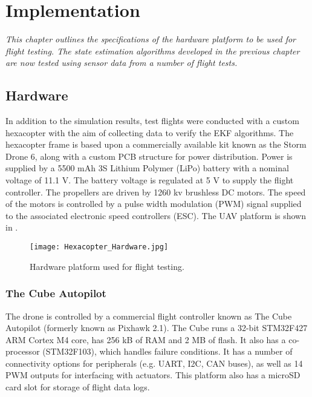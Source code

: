
\chapter{Implementation}\label{chapter:Implementation}
\textit{This chapter outlines the specifications of the hardware platform to be used for flight testing. The state estimation algorithms developed in the previous chapter are now tested using sensor data from a number of flight tests. }


\section{Hardware}\label{section:Hardware}

In addition to the simulation results, test flights were conducted with a custom hexacopter with the aim of collecting data to verify the EKF algorithms. The hexacopter frame is based upon a commercially available kit known as the Storm Drone 6, along with a custom PCB structure for power distribution. Power is supplied by a 5500 mAh 3S Lithium Polymer (LiPo) battery with a nominal voltage of 11.1 V. The battery voltage is regulated at 5 V to supply the flight controller. The propellers are driven by 1260 kv brushless DC motors. The speed of the motors is controlled by a pulse width modulation (PWM) signal supplied to the associated electronic speed controllers (ESC). The UAV platform is shown in .

\begin{figure}[htb]
	\texttt{[image: Hexacopter\_Hardware.jpg]}%
	\caption{Hardware platform used for flight testing.}%
	\label{fig:hardware}%
\end{figure}

\subsection{The Cube Autopilot}
The drone is controlled by a commercial flight controller known as The Cube Autopilot (formerly known as Pixhawk 2.1). The Cube runs a 32-bit STM32F427 ARM Cortex M4 core, has 256 kB of RAM and 2 MB of flash. It also has a co-processor (STM32F103), which handles failure conditions. It has a number of connectivity options for peripherals (e.g. UART, I2C, CAN buses), as well as 14 PWM outputs for interfacing with actuators. This platform also has a microSD card slot for storage of flight data logs.
